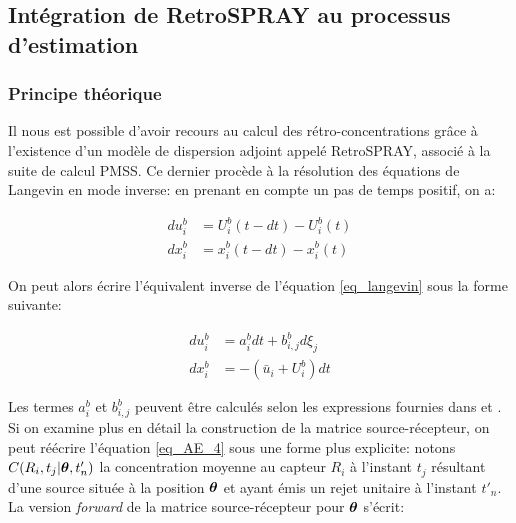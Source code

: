 \subsection{Intégration de RetroSPRAY au processus d'estimation}

\subsubsection{Principe théorique}

Il nous est possible d'avoir recours au calcul des rétro-concentrations grâce à l'existence d'un modèle de dispersion adjoint appelé RetroSPRAY, associé à la suite de calcul PMSS. Ce dernier procède à la résolution des équations de Langevin en mode inverse: en prenant en compte un pas de temps positif, on a: 

\begin{equation}
\begin{split}
du_i^b &= U_i^b (t-dt) - U_i^b(t) \\
dx_i^b &= x_i^b (t-dt) - x_i^b(t)
\end{split}
\label{eq_langevin_inv1}
\end{equation}

On peut alors écrire l'équivalent inverse de l'équation \eqref{eq_langevin} sous la forme suivante:

\begin{equation}
	\begin{split}
	du_i^b &= a_i^b dt + b_{i,j}^b d\xi_j \\
	dx_i^b &= -(\bar{u}_i + U_i^b )dt
	\end{split}
	\label{eq_langevin_inv2}
\end{equation}

Les termes $a_i^b$ et $ b_{i,j}^b$ peuvent être calculés selon les expressions fournies dans \cite{Flesch1995} et \cite{Wilson2009}. \\

Si on examine plus en détail la construction de la matrice source-récepteur, on peut réécrire l'équation \eqref{eq_AE_4} sous une forme plus explicite: notons $C(R_i,t_j |{\bm{\theta}}, t'_n)$ la concentration moyenne au capteur $R_i$ à l'instant $t_j$ résultant d'une source située à la position ${\bm{\theta}}$ et ayant émis un rejet unitaire à l'instant $t'_n$. La version \textit{forward} de la matrice source-récepteur pour ${\bm{\theta}}$ s'écrit:

